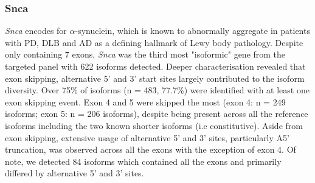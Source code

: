\subsubsection{Snca}
\textit{Snca} encodes for $\alpha$-synuclein, which is known to abnormally aggregate in patients with PD, DLB and AD as a defining hallmark of Lewy body pathology. Despite only containing 7 exons, \textit{Snca} was the third most "isoformic" gene from the targeted panel with 622 isoforms detected. Deeper characterisation revealed that exon skipping, alternative 5' and 3' start sites largely contributed to the isoform diversity. Over 75\% of isoforms (n  = 483, 77.7\%) were identified with at least one exon skipping event. Exon 4 and 5 were skipped the most (exon 4: n = 249 isoforms; exon 5: n = 206 isoforms), despite being present across all the reference isoforms including the two known shorter isoforms (i.e constitutive). Aside from exon skipping, extensive usage of alternative 5' and 3' sites, particularly A5' truncation, was observed across all the exons with the exception of exon 4. Of note, we detected 84 isoforms which contained all the exons and primarily differed by alternative 5' and 3' sites. 

